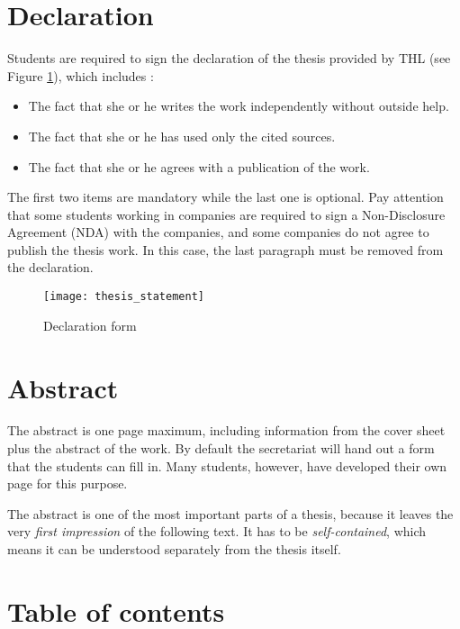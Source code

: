 \section{Declaration} \label{sec_declaration}

Students are required to sign the declaration of the thesis provided by THL (see Figure \ref{fig:declaration}), which includes \cite{kun08}:
\begin{itemize}
\item The fact that she or he writes the work independently without outside help.
\item The fact that she or he has used only the cited sources.
\item The fact that she or he agrees with a publication of the work.
\end{itemize}

The first two items are mandatory while the last one is optional. Pay attention that some students working in companies are required to sign a Non-Disclosure Agreement (NDA) with the companies, and some companies do not agree to publish the thesis work. In this case, the last paragraph must be removed from the declaration.

\begin{figure}[htb]
  \centering
  \texttt{[image: thesis\_statement]}\\ %
  \caption{Declaration form}\label{fig:declaration}
\end{figure}

\section{Abstract}

The abstract is one page maximum, including information from the cover sheet plus the abstract of the work. By default the secretariat will hand out a form that the students can fill in. Many students, however, have developed their own page for this purpose. 

The abstract is one of the most important parts of a thesis, because it leaves the very \textit{first impression} of the following text. It has to be \textit{self-contained}, which means it can be understood separately from the thesis itself. 

\section{Table of contents}


